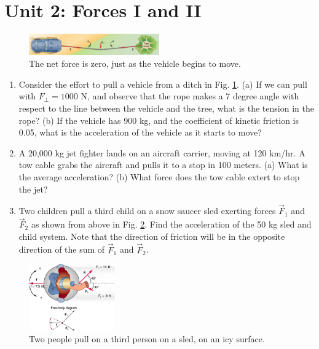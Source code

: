 \documentclass[10pt]{article}
\begin{document}
\section{Unit 2: Forces I and II}

\begin{figure}
\centering
\includegraphics[width=0.5\textwidth]{rope.jpeg}
\caption{\label{fig:2} The net force is zero, just as the vehicle begins to move.}
\end{figure}

\begin{enumerate}
\item Consider the effort to pull a vehicle from a ditch in Fig. \ref{fig:2}. (a) If we can pull with $F_{\perp} = 1000$ N, and observe that the rope makes a 7 degree angle with respect to the line between the vehicle and the tree, what is the tension in the rope? (b) If the vehicle has 900 kg, and the coefficient of kinetic friction is 0.05, what is the acceleration of the vehicle as it starts to move? \\ \vspace{3.5cm}
\item A 20,000 kg jet fighter lands on an aircraft carrier, moving at 120 km/hr. A tow cable grabs the aircraft and pulls it to a stop in 100 meters. (a) What is the average acceleration? (b) What force does the tow cable extert to stop the jet? \\ \vspace{3.5cm}
\item Two children pull a third child on a snow saucer sled exerting forces $\vec{F}_1$ and $\vec{F}_2$ as shown from above in Fig. \ref{fig:3}. Find the acceleration of the 50 kg sled and child system. Note that the direction of friction will be in the opposite direction of the sum of $\vec{F}_1$ and $\vec{F}_2$. \\ \vspace{2cm}
\end{enumerate}

\begin{figure}
\centering
\includegraphics[width=0.33\textwidth]{sled.jpeg}
\caption{\label{fig:3} Two people pull on a third person on a sled, on an icy surface.}
\end{figure}
\end{document}
